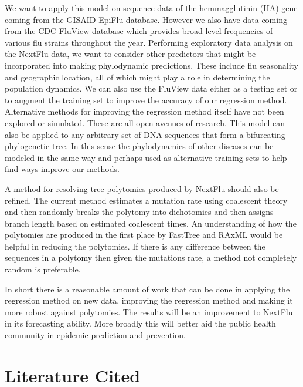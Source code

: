 \documentclass[10pt, oneside]{article}
\begin{document}
We want to apply this model on sequence data of the hemmagglutinin (HA) gene coming from the GISAID EpiFlu database. However we also have data coming from the CDC FluView database which provides broad level frequencies of various flu strains throughout the year. Performing exploratory data analysis on the NextFlu data, we want to consider other predictors that might be incorporated into making phylodynamic predictions. These include flu seasonality and geographic location, all of which might play a role in determining the population dynamics. We can also use the FluView data either as a testing set or to augment the training set to improve the accuracy of our regression method. Alternative methods for improving the regression method itself have not been explored or simulated. These are all open avenues of research. This model can also be applied to any arbitrary set of DNA sequences that form a bifurcating phylogenetic tree. In this sense the phylodynamics of other diseases can be modeled in the same way and perhaps used as alternative training sets to help find ways improve our methods. 

A method for resolving tree polytomies produced by NextFlu should also be refined. The current method estimates a mutation rate using coalescent theory and then randomly breaks the polytomy into dichotomies and then assigns branch length based on estimated coalescent times\cite{wang_2017}. An understanding of how the polytomies are produced in the first place by FastTree and RAxML would be helpful in reducing the polytomies. If there is any difference between the sequences in a polytomy then given the mutations rate, a method not completely random is preferable. 

In short there is a reasonable amount of work that can be done in applying the regression method on new data, improving the regression method and making it more robust against polytomies. The results will be an improvement to NextFlu in its forecasting ability. More broadly this will better aid the public health community in epidemic prediction and prevention. 

\section{Literature Cited}


\end{document}
